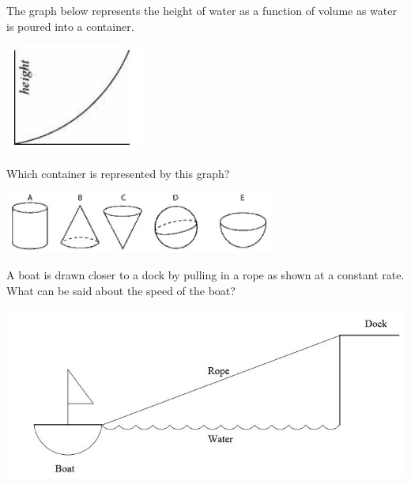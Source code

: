 \documentclass{ximera}
\newcommand{\recommendation}[1]{}
\newcommand{\GoodQuestions}[1]{}
\newcommand{\PCA}[1]{}
\begin{document}
\begin{problem}
  \recommendation{Elizabeth}
  \PCA{\#15}
  
  The graph below represents the height of water as a function of
  volume as water is poured into a container.
  \begin{image}
    \includegraphics[scale = 1]{height}
  \end{image}
  Which container is represented by this graph?
  \begin{image}
  \includegraphics[width=3.5in]{shapes}  
  \end{image}
  \begin{multipleChoice}
  \end{multipleChoice}

\end{problem}


  



\begin{problem}
  \recommendation{Elizabeth}
  \GoodQuestions{Subject: Related Rates 2P}
  A boat is drawn closer to a dock by pulling in a rope as shown at a
  constant rate.  What can be said about the speed of the boat?
  \begin{image}
    \includegraphics[scale=.7]{boat}
  \end{image}
  \begin{multipleChoice}
  \end{multipleChoice}
\end{problem}
\end{document}
